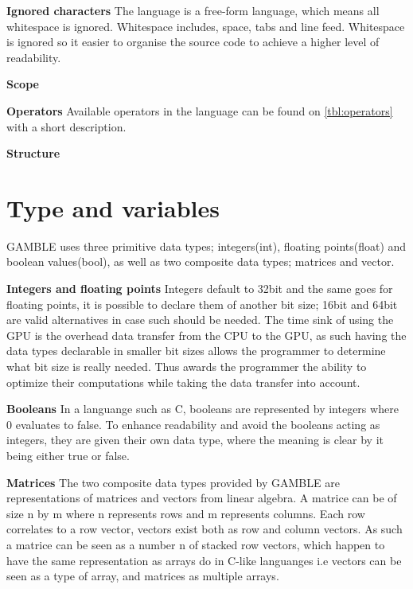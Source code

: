 \textbf{Ignored characters}
The language is a free-form language, which means all whitespace is ignored.
Whitespace includes, space, tabs and line feed.
Whitespace is ignored so it easier to organise the source code to achieve a higher level of readability.

\textbf{Scope}

\textbf{Operators}
Available operators in the language can be found on \ref{tbl:operators} with a short description.
  

\textbf{Structure} 


\section{Type and variables}\label{sec:Types}
GAMBLE uses three primitive data types; integers(int), floating points(float) and boolean values(bool), as well as two composite data types; matrices and vector.

\textbf{Integers and floating points}
Integers default to 32bit and the same goes for floating points, it is possible to declare them of another bit size; 16bit and 64bit are valid alternatives in case such should be needed.%
The time sink of using the GPU is the overhead data transfer from the CPU to the GPU, as such having the data types declarable in smaller bit sizes allows the programmer to determine what bit size is really needed.
Thus awards the programmer the ability to optimize their computations while taking the data transfer into account.

\textbf{Booleans}
In a languange such as C, booleans are represented by integers where 0 evaluates to false.
To enhance readability and avoid the booleans acting as integers, they are given their own data type, where the meaning is clear by it being either true or false.

\textbf{Matrices}
The two composite data types provided by GAMBLE are representations of matrices and vectors from linear algebra.
A matrice can be of size n by m where n represents rows and m represents columns.
Each row correlates to a row vector, vectors exist both as row and column vectors.
As such a matrice can be seen as a number n of stacked row vectors, which happen to have the same representation as arrays do in C-like languanges i.e vectors can be seen as a type of array, and matrices as multiple arrays.

